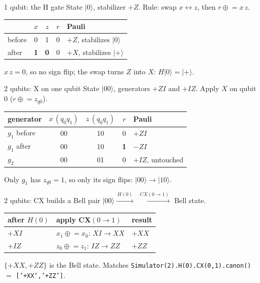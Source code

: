 \documentclass[aspectratio=169]{beamer}
\newcommand{\code}[1]{\texttt{#1}}
\begin{document}
\begin{frame}{1 qubit: the H gate}
  State $|0\rangle$, stabilizer $+Z$. Rule: swap $x\!\leftrightarrow\!z$, then $r \mathrel{\oplus}= x\,z$.
  \vfill
  \begin{center}\large
  \begin{tabular}{lcccl}
    \toprule
     & $x$ & $z$ & $r$ & Pauli \\
    \midrule
    before & 0 & 1 & 0 & $+Z$, stabilizes $|0\rangle$ \\
    after  & \textbf{1} & \textbf{0} & 0 & $+X$, stabilizes $|{+}\rangle$ \\
    \bottomrule
  \end{tabular}
  \end{center}
  \vfill
  \begin{center}\small $x\,z=0$, so no sign flip; the swap turns $Z$ into $X$: $H|0\rangle=|{+}\rangle$.\end{center}
\end{frame}

\begin{frame}{2 qubits: X on one qubit}
  State $|00\rangle$, generators $+ZI$ and $+IZ$. Apply $X$ on qubit 0 ($r \mathrel{\oplus}= z_{q0}$).
  \vfill
  \begin{center}\large
  \begin{tabular}{lcccl}
    \toprule
    generator & $x\,(q_0q_1)$ & $z\,(q_0q_1)$ & $r$ & Pauli \\
    \midrule
    $g_1$ before & 00 & 10 & 0 & $+ZI$ \\
    $g_1$ after  & 00 & 10 & \textbf{1} & $-ZI$ \\[2pt]
    $g_2$ & 00 & 01 & 0 & $+IZ$, untouched \\
    \bottomrule
  \end{tabular}
  \end{center}
  \vfill
  \begin{center}\small Only $g_1$ has $z_{q0}=1$, so only its sign flips: $|00\rangle \to |10\rangle$.\end{center}
\end{frame}

\begin{frame}{2 qubits: CX builds a Bell pair}
  $|00\rangle \xrightarrow{\,H(0)\,}\ \xrightarrow{\,CX(0\to1)\,}$ Bell state.
  \vfill
  \begin{center}\large
  \begin{tabular}{lll}
    \toprule
    after $H(0)$ & apply CX$(0\!\to\!1)$ & result \\
    \midrule
    $+XI$ & $x_1 \mathrel{\oplus}= x_0$: $XI \to XX$ & $+XX$ \\
    $+IZ$ & $z_0 \mathrel{\oplus}= z_1$: $IZ \to ZZ$ & $+ZZ$ \\
    \bottomrule
  \end{tabular}
  \end{center}
  \vfill
  \begin{center}\small
    $\{+XX,+ZZ\}$ is the Bell state. Matches \code{Simulator(2).H(0).CX(0,1).canon()} $=$ \code{['+XX','+ZZ']}.
  \end{center}
\end{frame}
\end{document}
